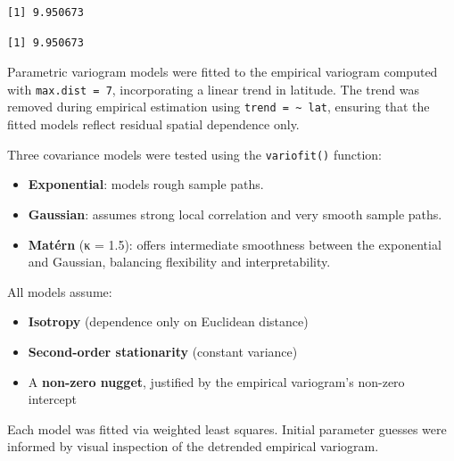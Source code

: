 \documentclass[
  11pt,
]{article}
\newenvironment{Shaded}{\begin{snugshade}}{\end{snugshade}}
\newcommand{\NormalTok}[1]{\textcolor[rgb]{0.00,0.23,0.31}{#1}}
\newcommand{\SpecialCharTok}[1]{\textcolor[rgb]{0.37,0.37,0.37}{#1}}
\begin{document}
\begin{Shaded}
\end{Shaded}

\begin{verbatim}
[1] 9.950673
\end{verbatim}

\begin{Shaded}
\end{Shaded}

\begin{verbatim}
[1] 9.950673
\end{verbatim}

Parametric variogram models were fitted to the empirical variogram
computed with \texttt{max.dist\ =\ 7}, incorporating a linear trend in
latitude. The trend was removed during empirical estimation using
\texttt{trend\ =\ \textasciitilde{}\ lat}, ensuring that the fitted
models reflect residual spatial dependence only.

Three covariance models were tested using the \texttt{variofit()}
function:

\begin{itemize}
\item
  \textbf{Exponential}: models rough sample paths.
\item
  \textbf{Gaussian}: assumes strong local correlation and very smooth
  sample paths.
\item
  \textbf{Matérn} (κ = 1.5): offers intermediate smoothness between the
  exponential and Gaussian, balancing flexibility and interpretability.
\end{itemize}

All models assume:

\begin{itemize}
\item
  \textbf{Isotropy} (dependence only on Euclidean distance)
\item
  \textbf{Second-order stationarity} (constant variance)
\item
  A \textbf{non-zero nugget}, justified by the empirical variogram's
  non-zero intercept
\end{itemize}

Each model was fitted via weighted least squares. Initial parameter
guesses were informed by visual inspection of the detrended empirical
variogram.
\end{document}
